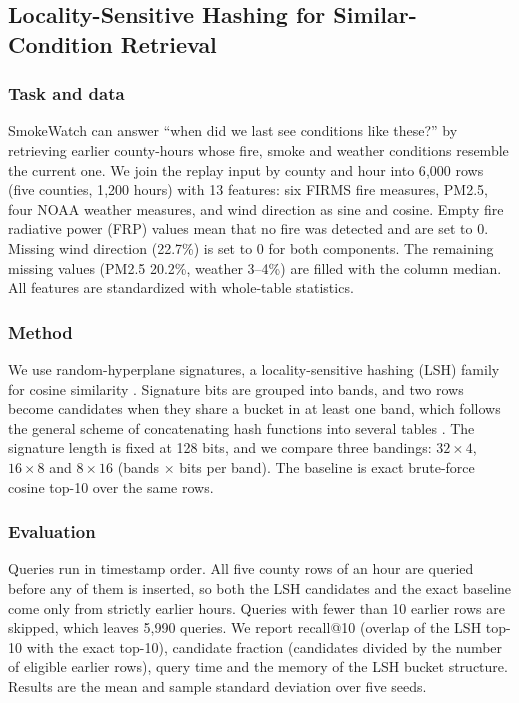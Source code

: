 \subsection{Locality-Sensitive Hashing for Similar-Condition Retrieval}

\subsubsection{Task and data}
SmokeWatch can answer ``when did we last see conditions like these?'' by retrieving earlier county-hours whose fire, smoke and weather conditions resemble the current one. We join the replay input by county and hour into 6{,}000 rows (five counties, 1{,}200 hours) with 13 features: six FIRMS fire measures, PM2.5, four NOAA weather measures, and wind direction as sine and cosine. Empty fire radiative power (FRP) values mean that no fire was detected and are set to 0. Missing wind direction (22.7\%) is set to 0 for both components. The remaining missing values (PM2.5 20.2\%, weather 3--4\%) are filled with the column median. All features are standardized with whole-table statistics.

\subsubsection{Method}
We use random-hyperplane signatures, a locality-sensitive hashing (LSH) family for cosine similarity \cite{charikar2002similarity}. Signature bits are grouped into bands, and two rows become candidates when they share a bucket in at least one band, which follows the general scheme of concatenating hash functions into several tables \cite{indyk1998approximate}. The signature length is fixed at 128 bits, and we compare three bandings: $32\times4$, $16\times8$ and $8\times16$ (bands $\times$ bits per band). The baseline is exact brute-force cosine top-10 over the same rows.

\subsubsection{Evaluation}
Queries run in timestamp order. All five county rows of an hour are queried before any of them is inserted, so both the LSH candidates and the exact baseline come only from strictly earlier hours. Queries with fewer than 10 earlier rows are skipped, which leaves 5{,}990 queries. We report recall@10 (overlap of the LSH top-10 with the exact top-10), candidate fraction (candidates divided by the number of eligible earlier rows), query time and the memory of the LSH bucket structure. Results are the mean and sample standard deviation over five seeds.

